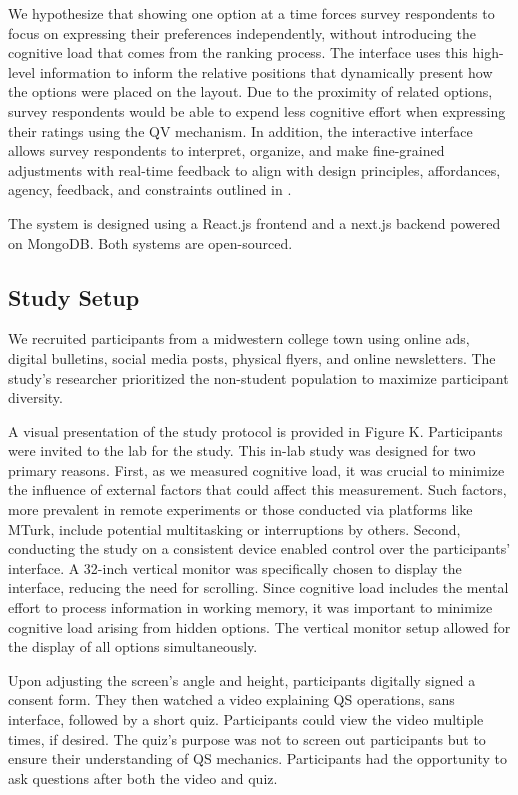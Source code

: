 We hypothesize that showing one option at a time forces survey respondents to focus on expressing their preferences independently, without introducing the cognitive load that comes from the ranking process. The interface uses this high-level information to inform the relative positions that dynamically present how the options were placed on the layout. Due to the proximity of related options, survey respondents would be able to expend less cognitive effort when expressing their ratings using the QV mechanism. In addition, the interactive interface allows survey respondents to interpret, organize, and make fine-grained adjustments with real-time feedback to align with design principles, affordances, agency, feedback, and constraints outlined in \cite{norman2013design}.

The system is designed using a React.js frontend and a next.js backend powered on MongoDB. Both systems are open-sourced.

\subsection{Study Setup}
We recruited participants from a midwestern college town using online ads, digital bulletins, social media posts, physical flyers, and online newsletters. The study's researcher prioritized the non-student population to maximize participant diversity.

A visual presentation of the study protocol is provided in Figure K. Participants were invited to the lab for the study. This in-lab study was designed for two primary reasons. First, as we measured cognitive load, it was crucial to minimize the influence of external factors that could affect this measurement. Such factors, more prevalent in remote experiments or those conducted via platforms like MTurk, include potential multitasking or interruptions by others. Second, conducting the study on a consistent device enabled control over the participants' interface. A 32-inch vertical monitor was specifically chosen to display the interface, reducing the need for scrolling. Since cognitive load includes the mental effort to process information in working memory, it was important to minimize cognitive load arising from hidden options. The vertical monitor setup allowed for the display of all options simultaneously.

Upon adjusting the screen's angle and height, participants digitally signed a consent form. They then watched a video explaining QS operations, sans interface, followed by a short quiz. Participants could view the video multiple times, if desired. The quiz's purpose was not to screen out participants but to ensure their understanding of QS mechanics. Participants had the opportunity to ask questions after both the video and quiz.

